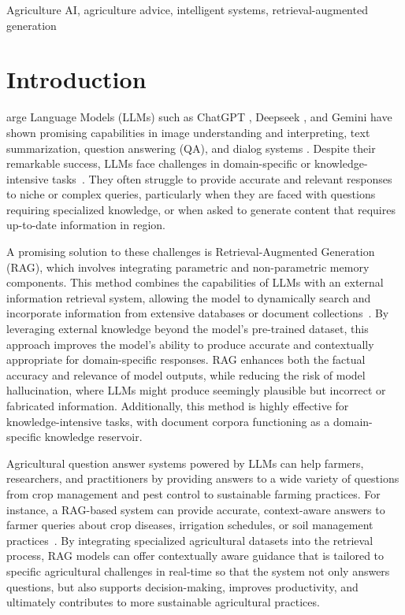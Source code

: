 \documentclass{ieeeaccess}
\begin{document}
\begin{keywords}
 Agriculture AI, agriculture advice, intelligent systems, retrieval-augmented generation 
\end{keywords}

\titlepgskip=-21pt

\maketitle

\section{Introduction}
arge Language Models (LLMs) such as ChatGPT \cite{OpenAI_Chat_API}, Deepseek \cite{deepseek}, and Gemini \cite{gemini} have shown promising capabilities in image understanding and interpreting, text summarization, question answering (QA), and dialog systems \cite{ren2023chatgpt, cart2025decoding, team2024gemini}. Despite their remarkable success, LLMs face challenges in domain-specific or knowledge-intensive tasks~\cite{lewis2020rag}. They often struggle to provide accurate and relevant responses to niche or complex queries, particularly when they are faced with questions requiring specialized knowledge, or when asked to generate content that requires up-to-date information in region.

A promising solution to these challenges is Retrieval-Augmented Generation (RAG), which involves integrating parametric and non-parametric memory components. This method combines the capabilities of LLMs with an external information retrieval system, allowing the model to dynamically search and incorporate information from extensive databases or document collections~\cite{guu2020realm, lewis2020rag}. By leveraging external knowledge beyond the model's pre-trained dataset, this approach  improves the model's ability to produce accurate and contextually appropriate for domain-specific responses. RAG enhances both the factual accuracy and relevance of model outputs, while reducing the risk of model hallucination, where LLMs might produce seemingly plausible but incorrect or fabricated information. Additionally, this method is highly effective for knowledge-intensive tasks, with document corpora functioning as a domain-specific knowledge reservoir.
 
Agricultural question answer systems powered by LLMs can help farmers, researchers, and practitioners by providing answers to a wide variety of questions from crop management and pest control to sustainable farming practices. For instance, a RAG-based system can provide accurate, context-aware answers to farmer queries about crop diseases, irrigation schedules, or soil management practices~\cite{lewis2020rag}. By integrating specialized agricultural datasets into the retrieval process, RAG models can offer contextually aware guidance that is tailored to specific agricultural challenges in real-time so that the system not only answers questions, but also supports decision-making, improves productivity, and ultimately contributes to more sustainable agricultural practices.
\end{document}

